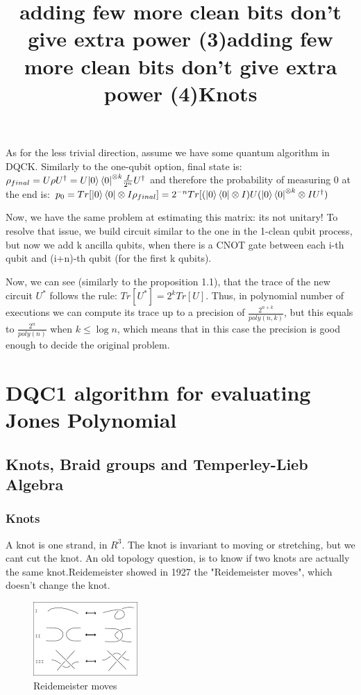 \documentclass{article}
\begin{document}
\title{adding few more clean bits don't give extra power (3)}
As for the less trivial direction, assume we have some quantum algorithm in DQCK.
Similarly to the one-qubit option, final state is:
$\rho_{final} = U\rho{U^\dagger} = U{\left\vert{0}\right\rangle\left\langle{0}\right\vert}^{\otimes k}\frac{I}{2^n}{U^\dagger}$
and therefore the probability of measuring 0 at the end is:
$p_{0} = Tr[{\Ket{0}\Bra{0}} \otimes I\rho_{final}] = 2^{-n}Tr[(\Ket{0}\Bra{0}\otimes I)U({\Ket{0}\Bra{0}}^{\otimes k}\otimes I{U^\dagger})$

Now, we have the same problem at estimating this matrix: its not unitary!
To resolve that issue, we build circuit similar to the one in the 1-clean qubit process,
but now we add k ancilla qubits, when there is a CNOT gate between each i-th qubit and (i+n)-th qubit (for the first k qubits).



\title{adding few more clean bits don't give extra power (4)}
Now, we can see (similarly to the proposition 1.1), that the trace of the new circuit $U^{*}$ follows the rule: $Tr[U^{*}] = 2^{k}Tr[U]$. Thus, in polynomial number of executions we can compute its trace up to a precision of $\frac{2^{n+k}}{poly(n,k)}$, but this equals to $\frac{2^{n}}{poly(n)}$ when $k  \leq \log{n}$, which means that in this case the precision is good enough to decide the original problem.



\section{DQC1 algorithm for evaluating Jones Polynomial}
\subsection{Knots, Braid groups and Temperley-Lieb Algebra}
\subsubsection{Knots}
\title{Knots}
A knot is one strand, in $R^3$. The knot is invariant to moving or stretching, but we cant cut the knot.
An old topology question, is to know if two knots are actually the same knot.Reidemeister showed in 1927
the "Reidemeister moves", which doesn't change the knot.
\begin{figure}
\includegraphics[scale=0.5]{Reidemeister} 
\caption{Reidemeister moves}
\end{figure}
\end{document}
